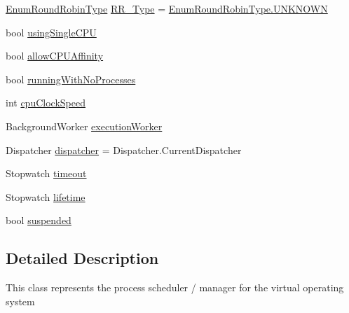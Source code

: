 \begin{DoxyCompactItemize}
\item 
\hyperlink{namespace_c_p_u___o_s___simulator_1_1_operating___system_a4c7effb8b6725df52018a3a14cede96e}{Enum\+Round\+Robin\+Type} \hyperlink{class_c_p_u___o_s___simulator_1_1_operating___system_1_1_scheduler_afa5f282549e500f0444d12048bdc31c9}{R\+R\+\_\+\+Type} = \hyperlink{namespace_c_p_u___o_s___simulator_1_1_operating___system_aea0b669d1bbf5690ae34ac2f8bef9470a696b031073e74bf2cb98e5ef201d4aa3}{Enum\+Round\+Robin\+Type.\+U\+N\+K\+N\+O\+W\+N}
\item 
bool \hyperlink{class_c_p_u___o_s___simulator_1_1_operating___system_1_1_scheduler_acd5c163fd74bd9e7ad4cbeb7f55c0338}{using\+Single\+C\+P\+U}
\item 
bool \hyperlink{class_c_p_u___o_s___simulator_1_1_operating___system_1_1_scheduler_a732d4b0d95cad3e280f9b69dd4f9f7c4}{allow\+C\+P\+U\+Affinity}
\item 
bool \hyperlink{class_c_p_u___o_s___simulator_1_1_operating___system_1_1_scheduler_af3276e8686d9efa7f8da6e48257922e3}{running\+With\+No\+Processes}
\item 
int \hyperlink{class_c_p_u___o_s___simulator_1_1_operating___system_1_1_scheduler_ae1829f5340f76cad2150c9e1f9ab3c69}{cpu\+Clock\+Speed}
\item 
Background\+Worker \hyperlink{class_c_p_u___o_s___simulator_1_1_operating___system_1_1_scheduler_a8b68cea278d24fcc12c6721210fe8dcb}{execution\+Worker}
\item 
Dispatcher \hyperlink{class_c_p_u___o_s___simulator_1_1_operating___system_1_1_scheduler_ab29898ad206dbc3a62234321cefe73ee}{dispatcher} = Dispatcher.\+Current\+Dispatcher
\item 
Stopwatch \hyperlink{class_c_p_u___o_s___simulator_1_1_operating___system_1_1_scheduler_adbb08b11d6d774001e688db129336719}{timeout}
\item 
Stopwatch \hyperlink{class_c_p_u___o_s___simulator_1_1_operating___system_1_1_scheduler_a765eabf93b7584d7d1476d18f283a85e}{lifetime}
\item 
bool \hyperlink{class_c_p_u___o_s___simulator_1_1_operating___system_1_1_scheduler_a844b64fe6c3917f055b61c4620995b74}{suspended}
\end{DoxyCompactItemize}


\subsection{Detailed Description}
This class represents the process scheduler / manager for the virtual operating system 



